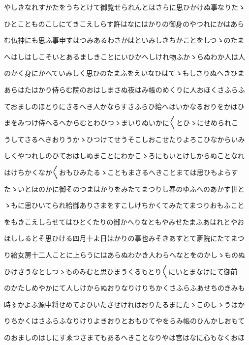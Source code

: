 \documentclass[a4paper,11pt,landscape]{ltjtarticle}
\begin{document}
\par\medskip
やしきなれすかたをうちとけて御覧せられんとはさらに思ひかけぬ事なりたゝ
\par\medskip
ひとことものこしにてきこえしらす許はなにはかりの御身のやつれにかはあら
\par\medskip
む仏神にも思ふ事申すはつみあるわさかはといみしきちかことをしつゝのたま
\par\medskip
へはしはしこそいとあるましきことにいひかへしけれ物ふかゝらぬわか人は人
\par\medskip
のかく身にかへていみしく思ひのたまふをえいなひはてゝもしさりぬへきひま
\par\medskip
あらはたはかり侍らむ院のおはしまさぬ夜はみ帳のめくりに人おほくさふらふ
\par\medskip
ておましのほとりにさるへき人かならすさふらひ給へはいかなるおりをかはひ
\par\medskip
まをみつけ侍へるへからむとわひつゝまいりぬいかに〱とひゝにせめられこ
\par\medskip
うしてさるへきおりうかゝひつけてせうそこしおこせたりよろこひなからいみ
\par\medskip
しくやつれしのひておはしぬまことにわかこゝろにもいとけしからぬことなれ
\par\medskip
はけちかくなか〱おもひみたるゝこともまさるへきことまては思ひもよらす
\par\medskip
たゝいとほのかに御そのつまはかりをみたてまつりし春のゆふへのあかす世と
\par\medskip
ゝもに思ひいてられ給御ありさまをすこしけちかくてみたてまつりおもふこと
\par\medskip
をもきこえしらせてはひとくたりの御かへりなともやみせたまふあはれとやお
\par\medskip
ほししるとそ思ひける四月十よ日はかりの事也みそきあすとて斎院にたてまつ
\par\medskip
り給女房十二人ことに上らうにはあらぬわかき人わらへなとをのかしゝものぬ
\par\medskip
ひけさうなとしつゝものみむと思ひまうくるもとり〱にいとまなけにて御前
\par\medskip
のかたしめやかにて人しけからぬおりなりけりちかくさふらふあせちのきみも
\par\medskip
時〻かよふ源中将せめてよひいたさせけれはおりたるまにたゝこのしゝうはか
\par\medskip
りちかくはさふらふなりけりよきおりとおもひてやをらみ帳のひんかしおもて
\par\medskip
のおましのはしにすゑつさまてもあるへきことなりやは宮はなに心もなくおほ
\par\medskip
\end{document}
